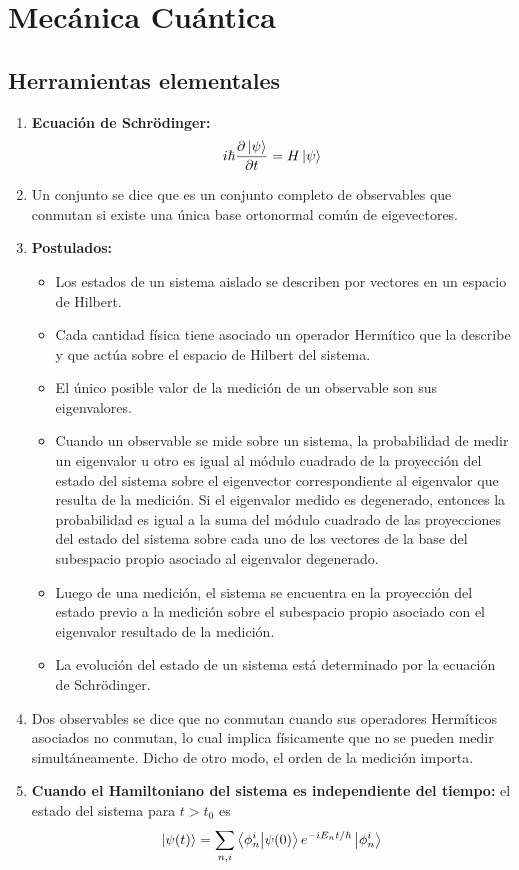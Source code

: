 \chapter{Mecánica Cuántica}

\section{Herramientas elementales}
\begin{enumerate}
	\item \textbf{Ecuación de Schrödinger:}
	\begin{align*}
		i\hbar \pdv{\ket{\psi}}{t}=H\ket{\psi}
	\end{align*}
	
	\item Un conjunto
	se dice que es un conjunto completo de observables que conmutan si existe
	una única base ortonormal común de eigevectores.
	
	\item \textbf{Postulados:}
	\begin{itemize}
	\item Los estados de un sistema aislado se describen por vectores en 
	un espacio de Hilbert.
	\item Cada cantidad física tiene asociado un operador Hermítico que la describe
	y que actúa sobre el espacio de Hilbert del sistema. 
	\item El único posible valor de la medición de un observable son sus 
	eigenvalores. 
	\item Cuando un observable se mide sobre un sistema, la probabilidad
	de medir un eigenvalor u otro es igual al módulo cuadrado de la proyección
	del estado del sistema sobre el eigenvector correspondiente al eigenvalor que 
	resulta de la medición. Si el eigenvalor medido es degenerado, entonces 
	la probabilidad es igual a la suma del módulo cuadrado de las proyecciones 
	del estado del sistema sobre cada uno de los vectores de la base del 
	subespacio propio asociado al eigenvalor degenerado. 
	\item Luego de una medición, el sistema se encuentra en la proyección 
	del estado previo a la medición sobre el subespacio propio asociado 
	con el eigenvalor resultado de la medición. 
	\item La evolución del estado de un sistema está determinado 
	por la ecuación de Schrödinger. 
	\end{itemize}
	
	\item Dos observables se dice que no conmutan cuando sus operadores 
	Hermíticos asociados no conmutan, lo cual implica físicamente que no 
	se pueden medir simultáneamente. Dicho de otro modo, el orden de la 
	medición importa. 
	
	\item \textbf{Cuando el Hamiltoniano del sistema es independiente 
	del tiempo:} el estado del sistema para $t>t_0$ es 
	\begin{align}
	\ket{\psi(t)}=\sum_{n,i}\braket{\phi_n^i}{\psi(0)}e^{-iE_nt/\hbar}\ket{\phi_n^i}
	\end{align}
\end{enumerate}   